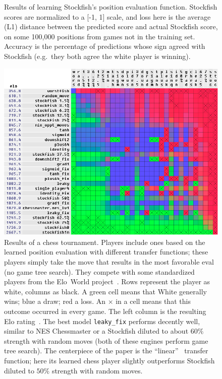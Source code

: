 \documentclass[twocolumn]{article}
\begin{document}
\begin{figure}[htp]
  
  \caption{
    Results of learning Stockfish's position evaluation function.
    Stockfish scores are normalized to a [-1, 1] scale, and loss
    here is the average (L1) distance between the predicted score
    and actual Stockfish score, on some 100,000 positions from
    games not in the training set. Accuracy is the percentage of
    predictions whose sign agreed with Stockfish (e.g.~they both
    agree the white player is winning).
  } \label{fig:chessresults}
\end{figure}

\begin{figure}[htp]
  \includegraphics[width=\linewidth]{elo}
  \caption{ Results of a chess tournament. Players include ones based
    on the learned position evaluation with different transfer
    functions; these players simply take the move that results in the
    most favorable eval (no game tree search). They compete with some
    standardized players from the Elo~World
    project~\cite{murphy2019eloworld}. Rows represent the player as
    white, columns as black. A green cell means that White generally
    wins; blue a draw; red a loss. An $\times$ in a cell means that
    this outcome occurred in every game. The left column is the
    resulting Elo rating~\cite{elo1978rating}. The best model
    {\tt leaky\_fix} performs decently well, similar to NES Chessmaster
    or a Stockfish diluted to about $60\%$ strength with random
    moves (both of these engines perform game tree search). The
    centerpiece of the paper is the ``linear'' \gradone\ transfer
    function; here its learned chess player slightly outperforms
    Stockfish diluted to $50\%$ strength with random moves.
  } \label{fig:elo}
\end{figure}
\end{document}
